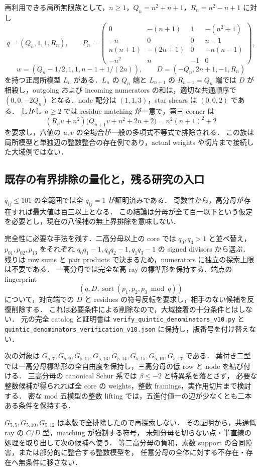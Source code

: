 再利用できる局所無限族として，$n\geq1$，$Q_n=n^2+n+1$，$R_n=n^2-n+1$ に対し
\[
 q=(Q_n,1,1,R_n),\qquad
 P_n=\begin{pmatrix}
 0&-(n+1)&1&-(n^2+1)\\
 -n&0&0&n-1\\
 n(n+1)&-(2n+1)&0&-n(n-1)\\
 -n^2&n&-1&0
 \end{pmatrix},
\]
\[
 w=(Q_n-1/2,1,1,n-1+1/(2n)),\qquad
 D=(-Q_n,2n+1,-1,R_n)
\]
を持つ正局所模型 $L_n$ がある．$L_n$ の $Q_n$ 端と $L_{n+1}$ の $R_{n+1}=Q_n$ 端では
$D$ が相殺し，outgoing および incoming numerators の和は，適切な共通順序で
$(0,0,-2Q_n)$ となる．node 配分は $(1,1,3)$，star shears は $(0,0,2)$ である．
しかし $n\geq2$ では residue matching が一意で，第三 corner は
\[
 (R_nu+n^2)\bigl(Q_{n+1}v+n^2+2n+2\bigr)
   =n^2(n+1)^2+2
\]
を要求し，六値の $u,v$ の全場合が一般の多項式不等式で排除される．
この族は局所模型と単独辺の整数整合の存在例であり，actual weights や切片まで接続した大域例ではない．

\subsection{既存の有界排除の量化と，残る研究の入口}

$q_{ij}\le101$ の全範囲では全 $q_{ij}=1$ が証明済みである．
奇数性から，高分母が存在すれば最大値は百三以上となる．
この結論は分母が全て百一以下という仮定を必要とし，現在の八候補の無上界排除を意味しない．

完全性に必要な手法を残す．二高分母以上の core では $q_0,q_3>1$ と並べ替え，
$p_{01},p_{02},p_{13}$ をそれぞれ $q_0q_1-1,q_0q_2-1,q_1q_3-1$ の signed divisors から選ぶ．
残りは row sums と pair products で決まるため，numerators に独立の探索上限は不要である．
一高分母では完全な高 ray の標準形を保持する．端点の fingerprint
\[
 \left(q,D,\operatorname{sort}(p_1,p_2,p_3\bmod q)\right)
\]
について，対向端での $D$ と residues の符号反転を要求し，相手のない候補を反復削除する．
これは必要条件による削除なので，大域接着の十分条件とはしない．
元の完全 catalog と証明書は
\nolinkurl{verify_quintic_denominators_v10.py} と
\nolinkurl{quintic_denominators_verification_v10.json} に保持し，版番号を付け替えない．

次の対象は $G_{5,7},G_{5,9},G_{5,11},G_{5,13},G_{5,14},G_{5,15},G_{5,16},G_{5,17}$ である．
葉付き二型では一高分母標準形の全自由度を保持し，三高分母の低 row と node を結び付ける．
三高分母の canonical Schur 系では $\beta\le-2$ と特異系を落とさず，
必要な整数候補が得られれば全 core の weights，整数 framings，実作用切片まで検討する．
密な mod 五模型の整数 lifting では，五進付値一の辺が少なくとも二本ある条件を保持する．

$G_{5,5},G_{5,10},G_{5,12}$ は本版で全排除したので再探索しない．
その証明から，共通低 ray の $C/D$ 型，matching が強制する符号，
未知分母を切らない点・半直線の処理を取り出して次の候補へ使う．
等二高分母の負和，素数 support の合同障害，または部分的に整合する整数模型を，
任意分母の全体に対する不存在・存在へ無条件に移さない．
